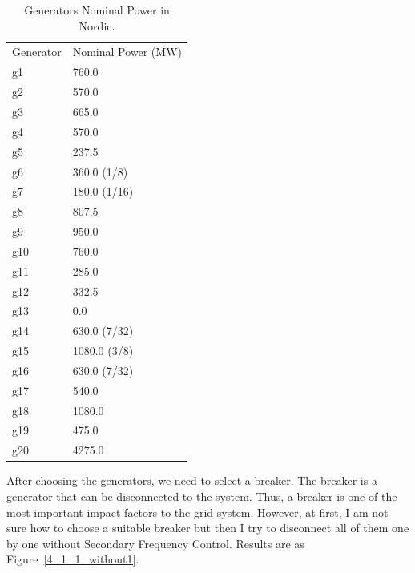 \begin{table}[htbp]
\centering
\begin{tabular}{ll}
Generator & Nominal Power (MW) \\
g1        & 760.0              \\
g2        & 570.0              \\
g3        & 665.0              \\
g4        & 570.0              \\
g5        & 237.5              \\
g6        & 360.0 (1/8)        \\
g7        & 180.0 (1/16)       \\
g8        & 807.5              \\
g9        & 950.0              \\
g10       & 760.0              \\
g11       & 285.0              \\
g12       & 332.5              \\
g13       & 0.0                \\
g14       & 630.0 (7/32)       \\
g15       & 1080.0 (3/8)       \\
g16       & 630.0 (7/32)       \\
g17       & 540.0              \\
g18       & 1080.0             \\
g19       & 475.0              \\
g20       & 4275.0             

\end{tabular}
\caption{Generators Nominal Power in Nordic.}
\label{nominalPower}
\end{table}

After choosing the generators, we need to select a breaker. The breaker is a generator that can be disconnected to the system. Thus, a breaker is one of the most important impact factors to the grid system. However, at first, I am not sure how to choose a suitable breaker but then I try to disconnect all of them one by one without Secondary Frequency Control. Results are as Figure~\ref{4_1_1_without1}. 

